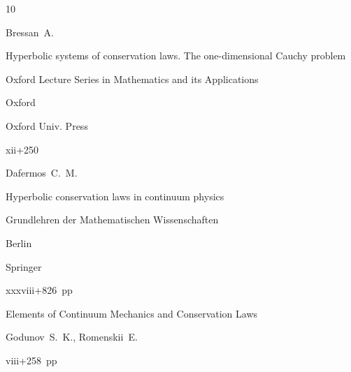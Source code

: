 


\pagebreak



\begin{thebibliography}{10}




\by Bressan~A.

\book Hyperbolic systems of conservation laws. The one-dimensional Cauchy problem


\serial Oxford Lecture Series in Mathematics and its Applications


\publaddr Oxford

\publ Oxford Univ. Press

\totalpages xii+250 









\by Dafermos~C.~M.

\book Hyperbolic conservation laws in continuum physics


\serial Grundlehren der Mathematischen Wissenschaften 


\publaddr Berlin


\publ Springer 

\totalpages xxxviii+826~pp \nofrills







\book Elements of Continuum Mechanics and Conservation Laws

\by Godunov~S.~K., Romenskii~E.


\totalpages viii+258~pp \nofrills 



\end{thebibliography}
